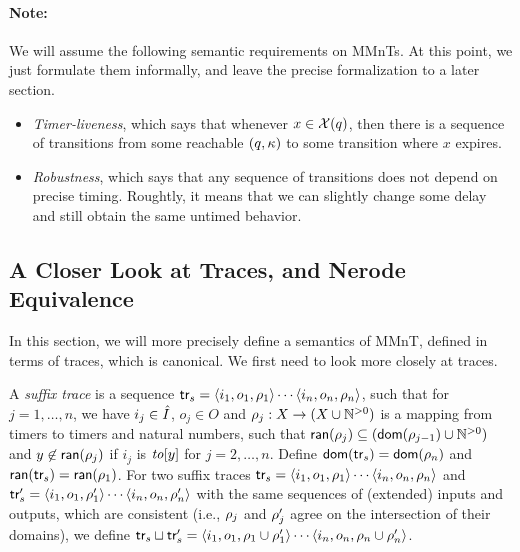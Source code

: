 \paragraph{Note:}
We will assume the following semantic requirements on MMnTs. At this point,
we just formulate them informally, and leave the precise formalization to
a later section.
\begin{itemize}
\item
    {\em Timer-liveness}, which says that whenever $x \in \mathcal{X}(q)$, then
  there is a sequence of transitions from some reachable $(q,\kappa)$ to some
  transition where $x$ expires.
\item
  {\em Robustness}, which says that any sequence of transitions does not
  depend on precise timing. Roughtly, it means that we can slightly change
  some delay and still obtain the same untimed behavior.
\end{itemize}

\subsection{A Closer Look at Traces, and Nerode Equivalence}  
In this section, we will more precisely define a semantics of MMnT,
defined in terms of traces, which is canonical. We first need to look more
closely at traces.

A {\em suffix trace}
is a sequence
$\textsf{tr}_s = \langle i_1,o_1,\rho_1\rangle\cdots\langle i_n,o_n,\rho_n\rangle$,
such that for $j = 1, \ldots , n$, we have $i_j \in \hat{I}$, $o_j \in O$ and
$\rho_j: X \rightarrow (X \cup {\mathbb N}^{>0})$ is a mapping from timers to
timers and natural numbers, such that 
${\textsf{ran}}(\rho_j) \subseteq ({\textsf{dom}}(\rho_{j-1}) \cup {\mathbb N}^{>0})$ and
$y \not\in {\textsf{ran}}(\rho_j)$ if $i_j$ is $\mathit{to}[y]$ for
$j = 2, \ldots, n$. Define
${\textsf{dom}}(\textsf{tr}_s) = {\textsf{dom}}(\rho_n)$ and
  ${\textsf{ran}}(\textsf{tr}_s) = {\textsf{ran}}(\rho_1)$.
For two suffix traces 
$\textsf{tr}_s = \langle i_1,o_1,\rho_1\rangle\cdots\langle i_n,o_n,\rho_n\rangle$ and
$\textsf{tr}_s' = \langle i_1,o_1,\rho_1'\rangle\cdots\langle i_n,o_n,\rho_n'\rangle$
with the same sequences of (extended) inputs and outputs, which
are consistent (i.e., $\rho_j$ and $\rho_j'$ agree on the intersection of their domains), we define 
$\textsf{tr}_s \sqcup \textsf{tr}_s' = \langle i_1,o_1,\rho_1 \cup \rho_1'\rangle\cdots\langle i_n,o_n,\rho_n\cup\rho_n'\rangle$.

